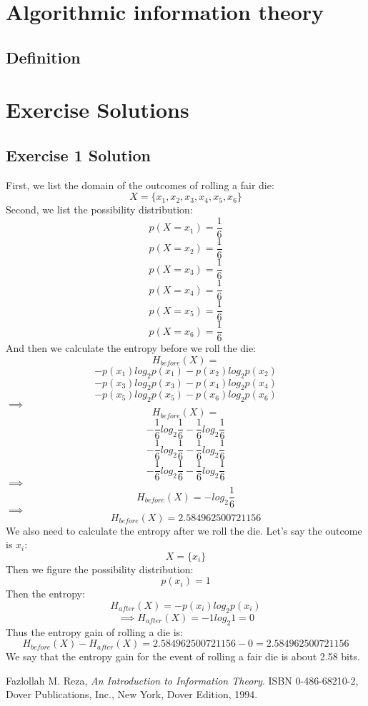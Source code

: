 \documentclass[12pt]{article}
\begin{document}
\section{Algorithmic information theory}

\subsection{Definition}

\section{Exercise Solutions}

\subsection{Exercise 1 Solution}
First, we list the domain of the outcomes of rolling a fair die:
\[
	X = \{x_1, x_2, x_3, x_4, x_5, x_6\}
\]
Second, we list the possibility distribution:
\[
	p(X=x_1) = \frac{1}{6}
\]
\[
	p(X=x_2) = \frac{1}{6}
\]
\[
	p(X=x_3) = \frac{1}{6}
\]
\[
	p(X=x_4) = \frac{1}{6}
\]
\[
	p(X=x_5) = \frac{1}{6}
\]
\[
	p(X=x_6) = \frac{1}{6}
\]
And then we calculate the entropy before we roll the die:
\[
	H_{before}(X) = 
\]
\[
	-p(x_1)log_{2}p(x_1)  
	- p(x_2)log_{2}p(x_2)
\]
\[
	- p(x_3)log_{2}p(x_3)
	- p(x_4)log_{2}p(x_4)
\]
\[
	- p(x_5)log_{2}p(x_5)
	- p(x_6)log_{2}p(x_6)
\]
$\implies$
\[
	H_{before}(X) = 
\]
\[
	-\frac{1}{6}log_{2}\frac{1}{6}  
	-\frac{1}{6}log_{2}\frac{1}{6}  
\]
\[
	-\frac{1}{6}log_{2}\frac{1}{6}  
	-\frac{1}{6}log_{2}\frac{1}{6}  
\]
\[
	-\frac{1}{6}log_{2}\frac{1}{6}  
	-\frac{1}{6}log_{2}\frac{1}{6}  
\]
$\implies$
\[
	H_{before}(X) = 
	-log_{2}\frac{1}{6}  
\]
$\implies$
\[
	H_{before}(X) = 2.584962500721156 
\]
We also need to calculate the entropy after we roll the die.
Let's say the outcome is $x_i$:
\[
	X = \{x_i\}
\]
Then we figure the possibility distribution:
\[
	p(x_i) = 1
\]
Then the entropy:
\[
	H_{after}(X) = 
	-p(x_i)log_{2}p(x_i)  
\]
\[
\implies
	H_{after}(X) = 
	-1log_{2}1 = 0
\]  
Thus the entropy gain of rolling a die is:
\[
	H_{before}(X) - H_{after}(X) = 2.584962500721156 - 0 = 2.584962500721156
\]
We say that the entropy gain for the event of rolling a fair die is about 2.58 bits.

\begin{thebibliography}{9}

  Fazlollah M. Reza,
  \emph{An Introduction to Information Theory}.
  ISBN 0-486-68210-2,
  Dover Publications, Inc., New York,
  Dover Edition,
  1994.

\end{thebibliography}

	
\end{document}
